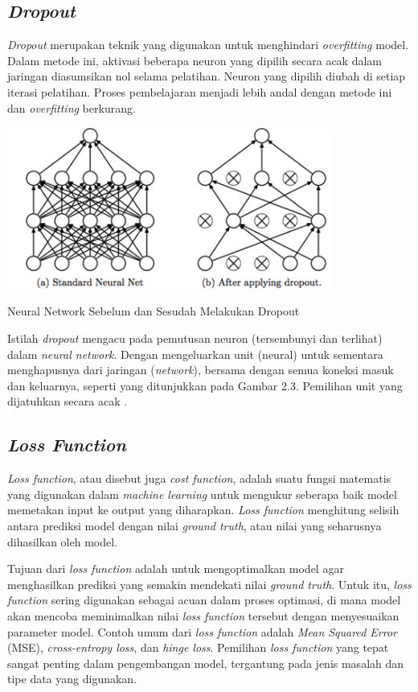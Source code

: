 \subsection{\textit{Dropout}}
\textit{Dropout} merupakan teknik yang digunakan untuk menghindari \textit{overfitting} model. Dalam metode ini, aktivasi beberapa neuron yang dipilih secara acak dalam jaringan diasumsikan nol selama pelatihan. Neuron yang dipilih diubah di setiap iterasi pelatihan. Proses pembelajaran menjadi lebih andal dengan metode ini dan \textit{overfitting} berkurang.
\begin{afigure}
    \includegraphics[width=0.8\textwidth, center]{images/Picture3.png}
    \caption{Neural Network Sebelum dan Sesudah Melakukan Dropout}
    \label{fig:dropout} 
\end{afigure}

Istilah \textit{dropout} mengacu pada pemutusan neuron (tersembunyi dan terlihat) dalam \textit{neural network}. Dengan mengeluarkan unit (neural) untuk sementara menghapusnya dari jaringan (\textit{network}), bersama dengan semua koneksi masuk dan keluarnya, seperti yang ditunjukkan pada Gambar 2.3. Pemilihan unit yang dijatuhkan secara acak \cite{yadav2022}. 


\subsection{\textit{Loss Function}}
\textit{Loss function}, atau disebut juga \textit{cost function}, adalah suatu fungsi matematis yang digunakan dalam \textit{machine learning} untuk mengukur seberapa baik model memetakan input ke output yang diharapkan. \textit{Loss function} menghitung selisih antara prediksi model dengan nilai \textit{ground truth}, atau nilai yang seharusnya dihasilkan oleh model.

Tujuan dari \textit{loss function} adalah untuk mengoptimalkan model agar menghasilkan prediksi yang semakin mendekati nilai \textit{ground truth}. Untuk itu, \textit{loss function} sering digunakan sebagai acuan dalam proses optimasi, di mana model akan mencoba meminimalkan nilai \textit{loss function} tersebut dengan menyesuaikan parameter model. Contoh umum dari \textit{loss function} adalah \textit{Mean Squared Error} (MSE), \textit{cross-entropy loss}, dan \textit{hinge loss}. Pemilihan \textit{loss function} yang tepat sangat penting dalam pengembangan model, tergantung pada jenis masalah dan tipe data yang digunakan.

